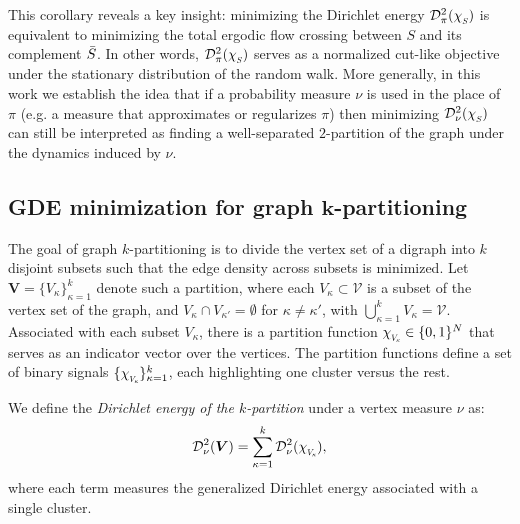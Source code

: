\documentclass[10pt]{article} %
\makeatletter
\def\gV{{\mathcal{V}}}
\newcommand{\GDE}{GDE\xspace}
\newcommand{\D}[2]{\mathcal{D}^2_{#1}(#2)}
\newcommand{\chivec}[1] {{\chi_{\raisebox{-0.15em}{\scalebox{0.6}{$#1$}}}}}
\newcommand{\eg}   			{e.g.\@\xspace}
\makeatother
\begin{document}
This corollary reveals a key insight: minimizing the Dirichlet energy $\D{\pi}{\chivec{S}}$ is equivalent to minimizing the total ergodic flow crossing between $S$ and its complement $\Bar{S}$. In other words, $\D{\pi}{\chivec{S}}$ serves as a normalized cut-like objective under the stationary distribution of the random walk. More generally, in this work we establish the idea that if a probability measure $\nu$ is used in the place of $\pi$ (\eg a measure that approximates or regularizes $\pi$) then minimizing $\D{\nu}{\chivec{S}}$ can still be interpreted as finding a well-separated $2$-partition of the graph under the dynamics induced by $\nu$.

\subsection{\GDE minimization for graph \texorpdfstring{$\boldsymbol{k}$}{k}-partitioning}
\label{sec:k-way-GDE}
The goal of graph $k$-partitioning is to divide the vertex set of a digraph into $k$ disjoint subsets such that the edge density across subsets is minimized. Let $\boldsymbol{V} = \{V_\kappa\}_{\kappa=1}^k$ denote such a partition, where each $V_\kappa \subset \gV$ is a subset of the vertex set of the graph, and $V_\kappa \cap V_{\kappa'} = \emptyset$ for $\kappa \neq \kappa'$, with $\bigcup_{\kappa=1}^k V_\kappa = \gV$.
%
Associated with each subset $V_\kappa$, there is a partition function $\chivec{V_\kappa} \in \{0,1\}^N$ that serves as an indicator vector over the vertices. The partition functions define a set of binary signals $\{ \chivec{V_\kappa} \}_{\kappa=1}^k$, each highlighting one cluster versus the rest.

We define the \emph{Dirichlet energy of the $k$-partition} under a vertex measure $\nu$ as:%
\begin{equation}\label{eq:dir_k-partition}
  \D{\nu}{\boldsymbol{V}} = \sum_{\kappa=1}^{k} \D{\nu}{\chivec{V_\kappa}},
\end{equation}%
where each term measures the generalized Dirichlet energy associated with a single cluster.
\end{document}
